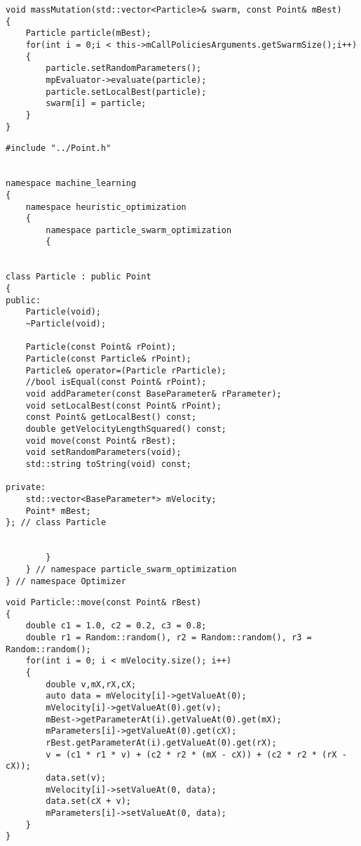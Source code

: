 \begin{lstlisting}
void massMutation(std::vector<Particle>& swarm, const Point& mBest)
{
    Particle particle(mBest);
    for(int i = 0;i < this->mCallPoliciesArguments.getSwarmSize();i++)
    {
        particle.setRandomParameters();
        mpEvaluator->evaluate(particle);
        particle.setLocalBest(particle);
        swarm[i] = particle;
    }
}
\end{lstlisting}



\begin{lstlisting}
#include "../Point.h"


namespace machine_learning
{
	namespace heuristic_optimization
	{
		namespace particle_swarm_optimization
		{


class Particle : public Point
{
public:
    Particle(void);
    ~Particle(void);

    Particle(const Point& rPoint);
    Particle(const Particle& rPoint);
    Particle& operator=(Particle rParticle);
    //bool isEqual(const Point& rPoint);
    void addParameter(const BaseParameter& rParameter);
    void setLocalBest(const Point& rPoint);
    const Point& getLocalBest() const;
    double getVelocityLengthSquared() const;
    void move(const Point& rBest);
    void setRandomParameters(void);
    std::string toString(void) const;

private:
    std::vector<BaseParameter*> mVelocity;
    Point* mBest;
}; // class Particle


		}
	} // namespace particle_swarm_optimization
} // namespace Optimizer
\end{lstlisting}





\begin{lstlisting}
void Particle::move(const Point& rBest)
{
    double c1 = 1.0, c2 = 0.2, c3 = 0.8;
    double r1 = Random::random(), r2 = Random::random(), r3 = Random::random();
    for(int i = 0; i < mVelocity.size(); i++)
    {
        double v,mX,rX,cX;
        auto data = mVelocity[i]->getValueAt(0);
        mVelocity[i]->getValueAt(0).get(v);
        mBest->getParameterAt(i).getValueAt(0).get(mX);
        mParameters[i]->getValueAt(0).get(cX);
        rBest.getParameterAt(i).getValueAt(0).get(rX);
        v = (c1 * r1 * v) + (c2 * r2 * (mX - cX)) + (c2 * r2 * (rX - cX));
        data.set(v);
        mVelocity[i]->setValueAt(0, data);
        data.set(cX + v);
        mParameters[i]->setValueAt(0, data);
    }
}
\end{lstlisting}
